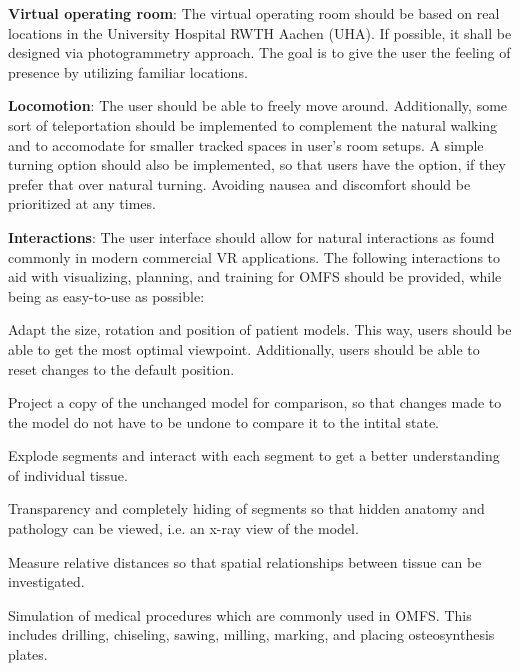 \begin{compactenum}[label=(\textbf{\Roman*})]
    \item\label{req::F1} \textbf{Virtual operating room}: The virtual operating room should be based on real locations in the University Hospital RWTH Aachen (UHA).
    If possible, it shall be designed via photogrammetry approach. The goal is to give the user the feeling of presence by utilizing familiar locations.
    \item\label{req::F2} \textbf{Locomotion}: The user should be able to freely move around.
    Additionally, some sort of teleportation should be implemented to complement the natural walking and to accomodate for smaller tracked spaces in user's room setups.
    A simple turning option should also be implemented, so that users have the option, if they prefer that over natural turning.
    Avoiding nausea and discomfort should be prioritized at any times.
    \item\label{req::F3} \textbf{Interactions}: The user interface should allow for natural interactions as found commonly in modern commercial VR applications.
    The following interactions to aid with visualizing, planning, and training for OMFS should be provided, while being as easy-to-use as possible:
    \begin{compactenum}[label=(\textbf{\roman*})]
        \item \label{req::F3.1}Adapt the size, rotation and position of patient models.
        This way, users should be able to get the most optimal viewpoint.
        Additionally, users should be able to reset changes to the default position.
        \item \label{req::F3.2}Project a copy of the unchanged model for comparison, so that changes made to the model do not have to be undone to compare it to the intital state.
        \item \label{req::F3.3}Explode segments and interact with each segment to get a better understanding of individual tissue.
        \item \label{req::F3.4}Transparency and completely hiding of segments so that hidden anatomy and pathology can be viewed, i.e. an x-ray view of the model.
        \item \label{req::F3.5}Measure relative distances so that spatial relationships between tissue can be investigated.
        \item \label{req::F3.6}Simulation of medical procedures which are commonly used in OMFS.
        This includes drilling, chiseling, sawing, milling, marking, and placing osteosynthesis plates.

\end{compactenum}
\end{compactenum}
